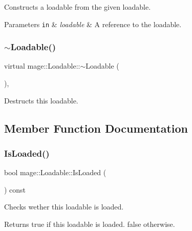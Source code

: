 Constructs a loadable from the given loadable.


\begin{DoxyParams}[1]{Parameters}
\mbox{\tt in}  & {\em loadable} & A reference to the loadable. \\
\hline
\end{DoxyParams}
\hypertarget{classmage_1_1_loadable_a009ef5ebc9baf803b19110d937922b41}{}\label{classmage_1_1_loadable_a009ef5ebc9baf803b19110d937922b41} 
\subsubsection{\texorpdfstring{$\sim$\+Loadable()}{~Loadable()}}
{\footnotesize\ttfamily virtual mage\+::\+Loadable\+::$\sim$\+Loadable (\begin{DoxyParamCaption}{ }\end{DoxyParamCaption})\hspace{0.3cm}{\ttfamily [protected]}, {\ttfamily [virtual]}}

Destructs this loadable. 

\subsection{Member Function Documentation}
\hypertarget{classmage_1_1_loadable_a53cfa5beb9b44bbcda0d6166a54b8cb6}{}\label{classmage_1_1_loadable_a53cfa5beb9b44bbcda0d6166a54b8cb6} 
\subsubsection{\texorpdfstring{Is\+Loaded()}{IsLoaded()}}
{\footnotesize\ttfamily bool mage\+::\+Loadable\+::\+Is\+Loaded (\begin{DoxyParamCaption}{ }\end{DoxyParamCaption}) const}

Checks wether this loadable is loaded.

\begin{DoxyReturn}{Returns}
{\ttfamily true} if this loadable is loaded. {\ttfamily false} otherwise. 
\end{DoxyReturn}
\hypertarget{classmage_1_1_loadable_a0bf85c35a57281661a67b5b151621534}{}\label{classmage_1_1_loadable_a0bf85c35a57281661a67b5b151621534} 
